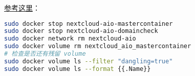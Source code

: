 \href{https://github.com/nextcloud/all-in-one#how-to-properly-reset-the-instance}{参考这里}：
\begin{lstlisting}[language=bash]
sudo docker stop nextcloud-aio-mastercontainer
sudo docker stop nextcloud-aio-domaincheck
sudo docker network rm nextcloud-aio
sudo docker volume rm nextcloud_aio_mastercontainer
# 检查是否还有残留 volume
sudo docker volume ls --filter "dangling=true"
sudo docker volume ls --format {{.Name}}
\end{lstlisting}
